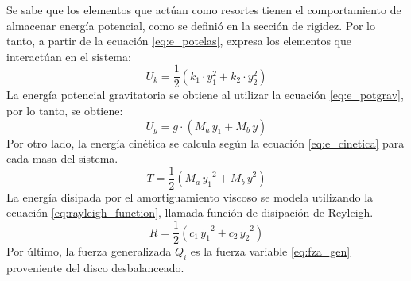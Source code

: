 Se sabe que los elementos que actúan como resortes tienen el comportamiento de almacenar energía potencial, como se definió en la sección de rigidez. Por lo tanto, a partir de la ecuación \ref{eq:e_potelas}, expresa los elementos que interactúan en el sistema:
\begin{equation}
	U_k = \frac{1}{2} \left(k_1\cdot y_1^2 + k_2\cdot y_2^2\right)
\end{equation}
La energía potencial gravitatoria se obtiene al utilizar la ecuación \ref{eq:e_potgrav}, por lo tanto, se obtiene:
\begin{equation}
	U_g = g\cdot \left(M_a\, y_1 + M_b\, y\right)
\end{equation}
Por otro lado, la energía cinética se calcula según la ecuación \ref{eq:e_cinetica} para cada masa del sistema.
\begin{equation}
	T = \frac{1}{2} \left(M_a\, \dot{y_1}^2 + M_b\, \dot{y}^2\right)
\end{equation}
La energía disipada por el amortiguamiento viscoso se modela utilizando la ecuación \ref{eq:rayleigh_function}, llamada función de disipación de Reyleigh. 
\begin{equation}
	R = \frac{1}{2} \left(c_1\, \dot{y_1}^2 + c_2\, \dot{y_2}^2\right)
\end{equation}
Por último, la fuerza generalizada $Q_i$ es la fuerza variable \ref{eq:fza_gen} proveniente del disco desbalanceado.

